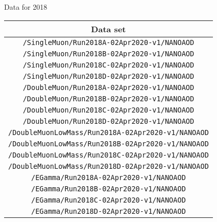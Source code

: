 Data for 2018
\begin{table}[!h]
\label{tab:datasets2018}
\begin{center}
{\footnotesize
\begin{tabular}{c}
\hline
Data set  \\
\hline
\texttt{/SingleMuon/Run2018A-02Apr2020-v1/NANOAOD} \\
\texttt{/SingleMuon/Run2018B-02Apr2020-v1/NANOAOD}\\
\texttt{/SingleMuon/Run2018C-02Apr2020-v1/NANOAOD}\\
\texttt{/SingleMuon/Run2018D-02Apr2020-v1/NANOAOD}\\
\texttt{/DoubleMuon/Run2018A-02Apr2020-v1/NANOAOD}\\
\texttt{/DoubleMuon/Run2018B-02Apr2020-v1/NANOAOD}\\
\texttt{/DoubleMuon/Run2018C-02Apr2020-v1/NANOAOD}\\
\texttt{/DoubleMuon/Run2018D-02Apr2020-v1/NANOAOD}\\
\texttt{/DoubleMuonLowMass/Run2018A-02Apr2020-v1/NANOAOD}\\
\texttt{/DoubleMuonLowMass/Run2018B-02Apr2020-v1/NANOAOD}\\
\texttt{/DoubleMuonLowMass/Run2018C-02Apr2020-v1/NANOAOD}\\
\texttt{/DoubleMuonLowMass/Run2018D-02Apr2020-v1/NANOAOD}\\
\texttt{/EGamma/Run2018A-02Apr2020-v1/NANOAOD}\\
\texttt{/EGamma/Run2018B-02Apr2020-v1/NANOAOD}\\
\texttt{/EGamma/Run2018C-02Apr2020-v1/NANOAOD}\\
\texttt{/EGamma/Run2018D-02Apr2020-v1/NANOAOD}\\
\end{tabular}
} %
\end{center}
\end{table}


